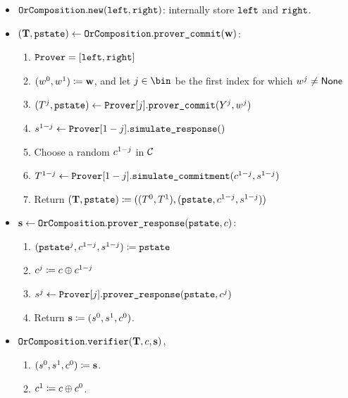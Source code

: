 \documentclass[11pt]{article}
\begin{document}
\begin{itemize}
  \item
  $\texttt{OrComposition}.\texttt{new}(\texttt{left}, \texttt{right})$: internally store $\texttt{left}$ and $\texttt{right}$.
  \item
  $(\mathbf {T}, \texttt{pstate})\gets \texttt{OrComposition}.\texttt{prover\_commit}(\mathbf {w})$:
    \begin{enumerate}
      \item $\texttt{Prover} = [\texttt{left}, \texttt{right}]$
      \item
        $(w^0,w^1)\coloneqq \mathbf {w}$, and let $j \in \bin$ be the first index for which $w^{j}\neq\mathsf{None}$
      \item
        $(T^j,\texttt{pstate})\gets\texttt{Prover}[j].\texttt{prover\_commit}(Y^j,w^j)$
      \item
			   $s^{1-j}\gets\texttt{Prover}[1-j].\texttt{simulate\_response}()$
			\item
        Choose a random $c^{1-j}$ in $\mathcal{C}$
      \item
        $T^{1-j}\gets\texttt{Prover}[1-j].\texttt{simulate\_commitment}(c^{1-j},s^{1-j})$
      \item
	Return $(\mathbf {T},\texttt{pstate}) \coloneqq ((T^0,T^1),(\texttt{pstate},c^{1-j},s^{1-j}))$
    \end{enumerate}
  \item
  $\mathbf {s} \gets \texttt{OrComposition}.\texttt{prover\_response}(\texttt{pstate}, c)$:
    \begin{enumerate}
      \item  $(\texttt{pstate}^j,c^{1-j},s^{1-j})\coloneqq\texttt{pstate}$
      \item
         $c^j\coloneqq c\oplus c^{1-j}$
         \item $s^j\gets\texttt{Prover}[j].\texttt{prover\_response}(\texttt{pstate}, c^j)$
      \item
        Return $\mathbf {s}\coloneqq(s^0,s^1, c^0)$.
    \end{enumerate}
  \item
  $\texttt{OrComposition}.\texttt{verifier}(\mathbf {T}, c, \mathbf {s})$,
    \begin{enumerate}
      \item
         $(s^0, s^1, c^0)\coloneqq \mathbf {s}$.
      \item
         $c^1\coloneqq c \oplus c^0$.

\end{enumerate}
\end{itemize}
\end{document}
